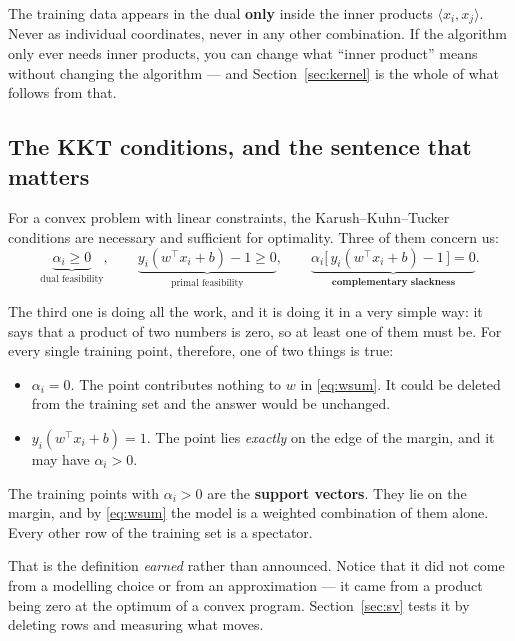 \documentclass[11pt]{article}
\begin{document}
\begin{keyidea}
The training data appears in the dual \textbf{only} inside the inner products
$\langle x_i, x_j\rangle$. Never as individual coordinates, never in any other
combination. If the algorithm only ever needs inner products, you can change
what ``inner product'' means without changing the algorithm --- and
Section~\ref{sec:kernel} is the whole of what follows from that.
\end{keyidea}

\subsection{The KKT conditions, and the sentence that matters}
\label{sec:kkt}

For a convex problem with linear constraints, the Karush--Kuhn--Tucker
conditions are necessary and sufficient for optimality. Three of them concern
us:
\begin{equation}
  \underbrace{\alpha_i \ge 0}_{\text{dual feasibility}},
  \qquad
  \underbrace{y_i(w^\top x_i + b) - 1 \ge 0}_{\text{primal feasibility}},
  \qquad
  \underbrace{\alpha_i\bigl[\,y_i(w^\top x_i + b) - 1\,\bigr] = 0}
    _{\textbf{complementary slackness}} .
  \label{eq:kkt}
\end{equation}

The third one is doing all the work, and it is doing it in a very simple way:
it says that a product of two numbers is zero, so at least one of them must be.
For every single training point, therefore, one of two things is true:

\begin{itemize}[leftmargin=*]
  \item $\alpha_i = 0$. The point contributes nothing to $w$ in
    \eqref{eq:wsum}. It could be deleted from the training set and the answer
    would be unchanged.
  \item $y_i(w^\top x_i + b) = 1$. The point lies \emph{exactly} on the edge of
    the margin, and it may have $\alpha_i > 0$.
\end{itemize}

\begin{keyidea}
The training points with $\alpha_i > 0$ are the \textbf{support vectors}. They
lie on the margin, and by \eqref{eq:wsum} the model is a weighted combination
of them alone. Every other row of the training set is a spectator.
\end{keyidea}

That is the definition \emph{earned} rather than announced. Notice that it did
not come from a modelling choice or from an approximation --- it came from a
product being zero at the optimum of a convex program. Section~\ref{sec:sv}
tests it by deleting rows and measuring what moves.
\end{document}
